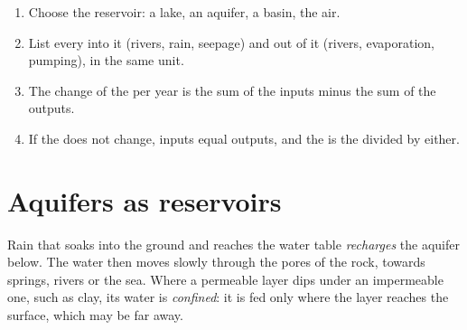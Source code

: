 \begin{method}\label{met:g10:freshwater-resources:budget}
\begin{enumerate}
  \item Choose the reservoir: a lake, an aquifer, a basin, the air.
  \item List every  into it (rivers, rain, seepage) and out of it
        (rivers, evaporation, pumping), in the same unit.
  \item The change of the  per year is the sum of the inputs minus the
        sum of the outputs.
  \item If the  does not change, inputs equal outputs, and the  is the  divided by either.
\end{enumerate}
\end{method}

\section{Aquifers as reservoirs}

Rain that soaks into the ground and reaches the water table \emph{recharges}
the aquifer below. The water then moves slowly through the pores of the rock,
towards springs, rivers or the sea. Where a
permeable layer dips under an impermeable one, such as clay, its water is
\emph{confined}: it is fed only where the layer reaches the surface, which may
be far away.

